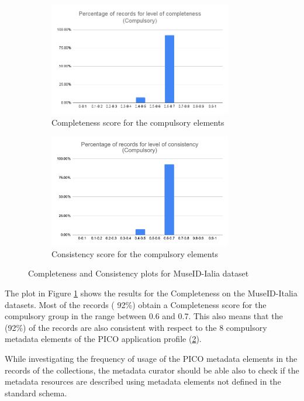 \documentclass[epsfig,a4paper,12pt,titlepage]{book}
\begin{document}
\begin{figure}[h]
        \centering
        \begin{subfigure}[b]{0.475\textwidth}
            \centering
            \includegraphics[width=8cm]{mdi_compulsory.png}
            \caption[Network2]%
            {{\small Completeness score for the compulsory elements}}    
            \label{fig:mdi_A_comple}
        \end{subfigure}
        \hfill
        \begin{subfigure}[b]{0.475\textwidth}  
            \centering 
            \includegraphics[width=8cm]{imageLikeEmbed.png}
            \caption[]%
            {{\small Consistency score for the compulsory elements}}    
            \label{fig:mdi_b_conciste}
        \end{subfigure}
    \caption[ Completeness and Consistency plots for MuseID-Ialia dataset ]
        {\small Completeness and Consistency plots for MuseID-Ialia dataset } 
        \label{consistency_MDI}
\end{figure}
The plot in Figure \ref{fig:mdi_A_comple} shows the results for the  Completeness on the MuseID-Italia datasets. Most of the records ( 92\%) obtain a Completeness score for the compulsory group in the range between 0.6 and 0.7. This also means that the (92\%) of the records are also consistent with respect to the 8 compulsory metadata elements of the PICO application profile (\ref{fig:mdi_b_conciste}).     

While investigating the frequency of usage of the PICO metadata elements in the records of the collections, the metadata curator should be able also to check if the metadata resources are described using metadata elements not defined in the standard schema.
\end{document}
